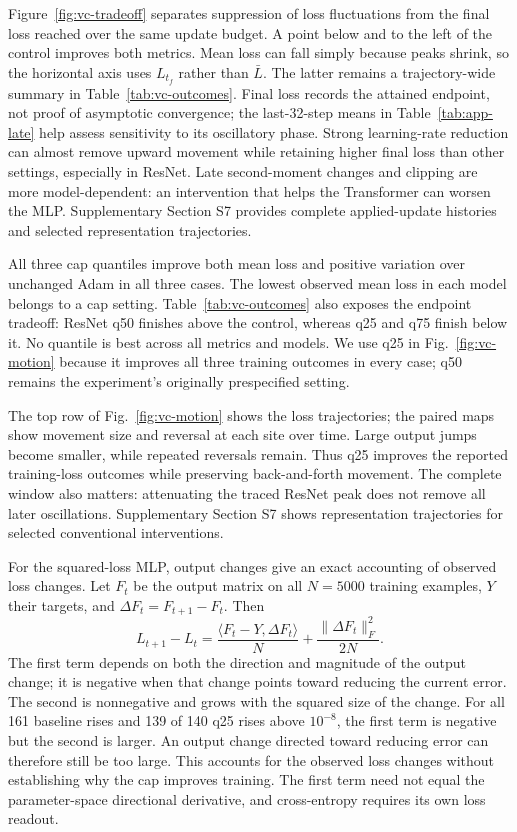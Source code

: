 Figure~\ref{fig:vc-tradeoff} separates suppression of loss fluctuations
from the final loss reached over the same update budget. A point below
and to the left of the control improves both metrics. Mean loss can fall
simply because peaks shrink, so the horizontal axis uses $L_{t_f}$ rather
than $\bar L$. The latter remains a trajectory-wide summary in
Table~\ref{tab:vc-outcomes}. Final loss records the attained endpoint,
not proof of asymptotic convergence; the last-32-step means in Table~\ref{tab:app-late} help assess sensitivity to its oscillatory phase. Strong
learning-rate reduction can almost remove upward movement while
retaining higher final loss than other settings,
especially in ResNet. Late second-moment changes and clipping are more
model-dependent: an intervention that helps the Transformer can worsen
the MLP. Supplementary Section S7 provides complete applied-update histories
and selected representation trajectories.

All three cap quantiles improve both mean loss and positive variation
over unchanged Adam in all three cases. The lowest observed mean loss
in each model belongs to a cap setting. Table~\ref{tab:vc-outcomes}
also exposes the endpoint tradeoff: ResNet q50 finishes above the
control, whereas q25 and q75 finish below it. No quantile is best across
all metrics and models. We use q25 in Fig.~\ref{fig:vc-motion} because
it improves all three training outcomes in every case; q50 remains the
experiment's originally prespecified setting.

The top row of Fig.~\ref{fig:vc-motion} shows the loss trajectories;
the paired maps show movement size and reversal at each site over time.
Large output jumps become smaller, while repeated reversals remain.
Thus q25 improves the reported training-loss outcomes while preserving
back-and-forth movement. The complete window also matters: attenuating
the traced ResNet peak does not remove all later oscillations.
Supplementary Section S7 shows representation trajectories for selected
conventional interventions.

For the squared-loss MLP, output changes give an exact accounting of
observed loss changes. Let $F_t$ be the output matrix on all $N=5000$
training examples, $Y$ their targets, and $\Delta F_t=F_{t+1}-F_t$. Then
\begin{equation}
 L_{t+1}-L_t=\frac{\langle F_t-Y,\Delta F_t\rangle}{N}
             +\frac{\|\Delta F_t\|_F^2}{2N}.
 \label{eq:vc-output-loss}
\end{equation}
The first term depends on both the direction and magnitude of the
output change; it is negative when that change points toward reducing
the current error. The second is nonnegative and grows with the squared
size of the change. For all 161 baseline rises and 139 of 140 q25 rises
above $10^{-8}$, the first term is negative but the second is larger.
An output change directed toward reducing error can therefore still be
too large. This accounts for the observed loss changes without
establishing why the cap improves training. The first term need not
equal the parameter-space directional derivative, and cross-entropy
requires its own loss readout.

